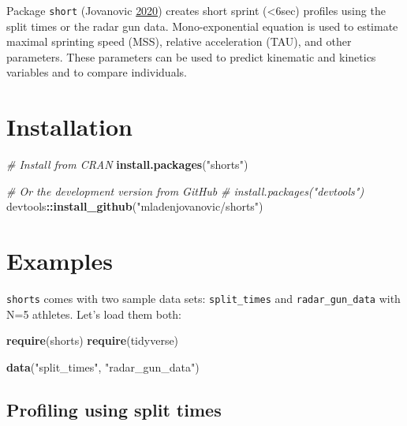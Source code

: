 \documentclass[
]{book}
\newenvironment{Shaded}{\begin{snugshade}}{\end{snugshade}}
\newcommand{\CommentTok}[1]{\textcolor[rgb]{0.56,0.35,0.01}{\textit{#1}}}
\newcommand{\KeywordTok}[1]{\textcolor[rgb]{0.13,0.29,0.53}{\textbf{#1}}}
\newcommand{\NormalTok}[1]{#1}
\newcommand{\OperatorTok}[1]{\textcolor[rgb]{0.81,0.36,0.00}{\textbf{#1}}}
\newcommand{\StringTok}[1]{\textcolor[rgb]{0.31,0.60,0.02}{#1}}
\begin{document}
Package \texttt{short} (Jovanovic \protect\hyperlink{ref-R-shorts}{2020}) creates short sprint (\textless6sec) profiles using the split times or the radar gun data. Mono-exponential equation is used to estimate maximal sprinting speed (MSS), relative acceleration (TAU), and other parameters. These parameters can be used to predict kinematic and kinetics variables and to compare individuals.

\hypertarget{installation}{%
\section{Installation}\label{installation}}

\begin{Shaded}
\begin{Highlighting}[]
\CommentTok{\# Install from CRAN}
\KeywordTok{install.packages}\NormalTok{(}\StringTok{"shorts"}\NormalTok{)}

\CommentTok{\# Or the development version from GitHub}
\CommentTok{\# install.packages("devtools")}
\NormalTok{devtools}\OperatorTok{::}\KeywordTok{install\_github}\NormalTok{(}\StringTok{"mladenjovanovic/shorts"}\NormalTok{)}
\end{Highlighting}
\end{Shaded}

\hypertarget{examples}{%
\section{Examples}\label{examples}}

\texttt{shorts} comes with two sample data sets: \texttt{split\_times} and \texttt{radar\_gun\_data} with N=5 athletes. Let's load them both:

\begin{Shaded}
\begin{Highlighting}[]
\KeywordTok{require}\NormalTok{(shorts)}
\KeywordTok{require}\NormalTok{(tidyverse)}

\KeywordTok{data}\NormalTok{(}\StringTok{"split\_times"}\NormalTok{, }\StringTok{"radar\_gun\_data"}\NormalTok{)}
\end{Highlighting}
\end{Shaded}

\hypertarget{profiling-using-split-times}{%
\subsection{Profiling using split times}\label{profiling-using-split-times}}
\end{document}
